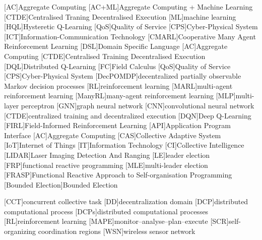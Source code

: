 [AC]{Aggregate Computing}
[AC+ML]{Aggregate Computing + Machine Learning}
[CTDE]{Centralised Traning Decentralised Execution}
[ML]{machine learning}
[HQL]{Hysteretic Q-Learning}
[QoS]{Quality of Service}
[CPS]{Cyber-Physical System}
[ICT]{Information-Communication Technology}
[CMARL]{Cooperative Many Agent Reinforcement Learning}
[DSL]{Domain Specific Language}
[AC]{Aggregate Computing}
[CTDE]{Centralised Training Decentralised Execution}
[DQL]{Distributed Q-Learning}
[FC]{Field Calculus}
[QoS]{Quality of Service}
[CPS]{Cyber-Physical System}
[DecPOMDP]{decentralized partially observable Markov decision processes}
[RL]{reinforcement learning}
[MARL]{multi-agent reinforcement learning}
[ManyRL]{many-agent reinforcement learning}
[MLP]{multi-layer perceptron}
[GNN]{graph neural network}
[CNN]{convolutional neural network}
[CTDE]{centralized training and decentralized execution}
[DQN]{Deep Q-Learning}
[FIRL]{Field-Informed Reinforcement Learning}
[API]{Application Program Interface}
[AC]{Aggregate Computing}
[CAS]{Collective Adaptive System}
[IoT]{Internet of Things}
[IT]{Information Technology}
[CI]{Collective Intelligence}
[LIDAR]{Laser Imaging Detection And Ranging}
[LE]{leader election}
[FRP]{functional reactive programming}
[MLE]{multi-leader election}
[FRASP]{Functional Reactive Approach to Self-organisation Programming}
[Bounded Election]{Bounded Election}

[CCT]{concurrent collective task}
[DD]{decentralization domain}
[DCP]{distributed computational process}
[DCPs]{distributed computational processes}
[RL]{reinforcement learning}
[MAPE]{monitor--analyse--plan--execute}
[SCR]{self-organizing coordination regions}
[WSN]{wireless sensor network}

